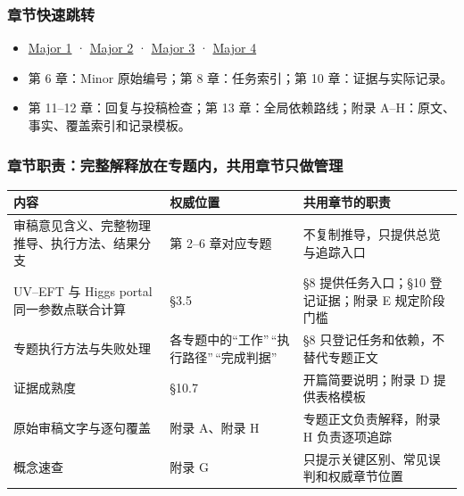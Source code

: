\documentclass[
  chinese,
  UTF8]{ctexart}
\newcounter{none} %
\providecommand{\tightlist}{%
  \setlength{\itemsep}{0pt}\setlength{\parskip}{0pt}}
\begin{document}
\subsubsection{章节快速跳转}\label{ux7ae0ux8282ux5febux901fux8df3ux8f6c}

\begin{itemize}
\tightlist
\item
  \hyperref[major-1]{Major 1} · \hyperref[major-2]{Major 2} ·
  \hyperref[major-3]{Major 3} · \hyperref[major-4]{Major 4}
\item
  第 6 章：Minor 原始编号；第 8 章：任务索引；第 10 章：证据与实际记录。
\item
  第 11--12 章：回复与投稿检查；第 13 章：全局依赖路线；附录
  A--H：原文、事实、覆盖索引和记录模板。
\end{itemize}

\subsubsection{章节职责：完整解释放在专题内，共用章节只做管理}\label{ux7ae0ux8282ux804cux8d23ux5b8cux6574ux89e3ux91caux653eux5728ux4e13ux9898ux5185ux5171ux7528ux7ae0ux8282ux53eaux505aux7ba1ux7406}

{\def\LTcaptype{none} %
\begin{longtable}[]{@{}
  >{\raggedright\arraybackslash}p{}
  >{\raggedright\arraybackslash}p{}
  >{\raggedright\arraybackslash}p{}@{}}
\toprule\noalign{}
\begin{minipage}[b]{\linewidth}\raggedright
内容
\end{minipage} & \begin{minipage}[b]{\linewidth}\raggedright
权威位置
\end{minipage} & \begin{minipage}[b]{\linewidth}\raggedright
共用章节的职责
\end{minipage} \\
\midrule\noalign{}
\endhead
\bottomrule\noalign{}
\endlastfoot
审稿意见含义、完整物理推导、执行方法、结果分支 & 第 2--6 章对应专题 &
不复制推导，只提供总览与追踪入口 \\
UV--EFT 与 Higgs portal 同一参数点联合计算 & §3.5 & §8 提供任务入口；§10
登记证据；附录 E 规定阶段门槛 \\
专题执行方法与失败处理 & 各专题中的``工作''\,``执行路径''\,``完成判据''
& §8 只登记任务和依赖，不替代专题正文 \\
证据成熟度 & §10.7 & 开篇简要说明；附录 D 提供表格模板 \\
原始审稿文字与逐句覆盖 & 附录 A、附录 H & 专题正文负责解释，附录 H
负责逐项追踪 \\
概念速查 & 附录 G & 只提示关键区别、常见误判和权威章节位置 \\
\end{longtable}
}
\end{document}
